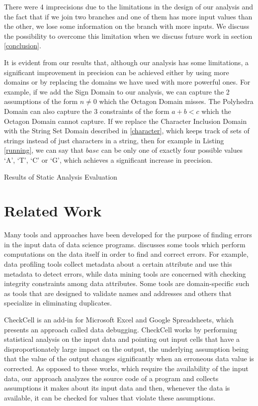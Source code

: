 \documentclass[10pt]{report}
\begin{document}
There were 4 imprecisions due to the limitations in the design of our analysis and the fact that if we join two branches and one of them has more input values than the other, we lose some information on the branch with more inputs. We discuss the possibility to overcome this limitation when we discuss future work in section \ref{conclusion}. 

It is evident from our results that, although our analysis has some limitations, a significant improvement in precision can be achieved either by using more domains or by replacing the domains we have used with more powerful ones. For example, if we add the Sign Domain to our analysis, we can capture the 2 assumptions of the form $ n \neq 0 $ which the Octagon Domain misses. The Polyhedra Domain can also capture the 3 constraints of the form $ a + b < c $ which the Octagon Domain cannot capture. If we replace the Character Inclusion Domain with the String Set Domain described in \ref{character}, which keeps track of sets of strings instead of just characters in a string, then for example in Listing \ref{running}, we can say that $ base $ can be only one of exactly four possible values `A', `T', `C' or `G', which achieves a significant increase in precision. 


\begin{table}  \caption{Results of Static Analysis Evaluation} \label{table}
	\let\center\empty
	\let\endcenter\relax
	\centering
	
\end{table}

\chapter{Related Work} \label{related}

Many tools and approaches have been developed for the purpose of finding errors in the input data of data science programs. \cite{cleaning} discusses some tools which perform computations on the data itself in order to find and correct errors. For example, data profiling tools collect metadata about a certain attribute and use this metadata to detect errors, while data mining tools are concerned with checking integrity constraints among data attributes. Some tools are domain-specific such as tools that are designed to validate names and addresses and others that specialize in eliminating duplicates. 

CheckCell \cite{checkcell} is an add-in for Microsoft Excel and Google Spreadsheets, which presents an approach called data debugging.  CheckCell works by performing statistical analysis on the input data and pointing out input cells that have a disproportionately large impact on the output, the underlying assumption being that the value of the output changes significantly when an erroneous data value is corrected. As opposed to these works, which require the availability of the input data, our approach analyzes the source code of a program and collects assumptions it makes about its input data and then, whenever the data is available, it can be checked for values that violate these assumptions. 
 
\end{document}
